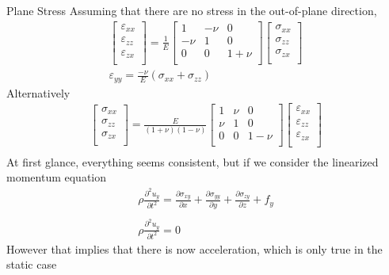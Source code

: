 \documentclass[a4paper, 11pt,article,oneside]{memoir}%
\begin{document}
\begin{eqbox2}{}{Plane Stress}
Assuming that there are no stress in the out-of-plane direction,
\begin{gather*}
\begin{bmatrix}
\varepsilon_{xx}\\
\varepsilon_{zz}\\
\varepsilon_{zx}\\
\end{bmatrix}=\frac{1}{E}
\begin{bmatrix}
1&-\nu&0\\
-\nu&1&0\\
0&0&1+\nu\\
\end{bmatrix}
\begin{bmatrix}
\sigma_{xx}\\
\sigma_{zz}\\
\sigma_{zx}\\
\end{bmatrix}\\
\varepsilon_{yy}=\frac{-\nu}{E}(\sigma_{xx}+\sigma_{zz})
\end{gather*}
Alternatively
\begin{gather*}
\begin{bmatrix}
\sigma_{xx}\\
\sigma_{zz}\\
\sigma_{zx}\\
\end{bmatrix}=\frac{E}{(1+\nu)(1-\nu)}
\begin{bmatrix}
1&\nu&0\\
\nu&1&0\\
0&0&1-\nu\\
\end{bmatrix}
\begin{bmatrix}
\varepsilon_{xx}\\
\varepsilon_{zz}\\
\varepsilon_{zx}\\
\end{bmatrix}\\
\end{gather*}
At first glance, everything seems consistent, but if we consider the linearized momentum equation 
\begin{gather*}
\rho \frac{\partial^2u_y}{\partial t^2}=\frac{\partial\sigma_{xy}}{\partial x}+\frac{\partial\sigma_{yy}}{\partial y}+\frac{\partial\sigma_{zy}}{\partial z}+f_y\\ \\
\rho \frac{\partial^2u_y}{\partial t^2}=0
\end{gather*}
However that implies that there is now acceleration, which is only true in the static case
\end{eqbox2}
\end{document}

